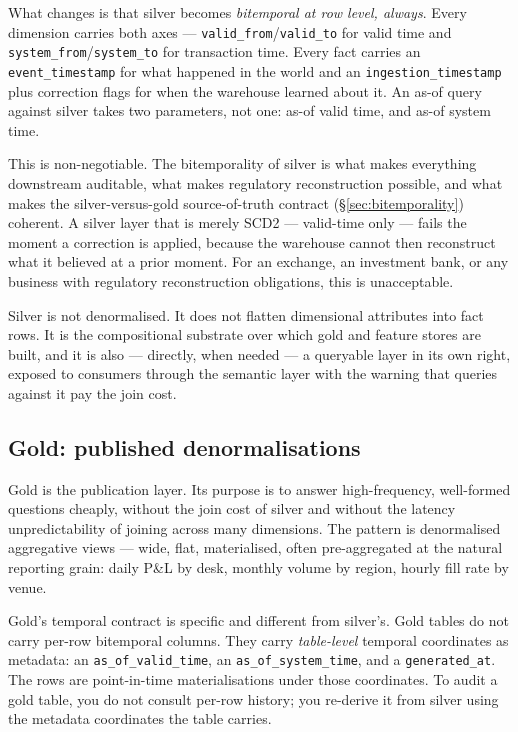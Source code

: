 \documentclass[11pt,a4paper]{article}
\begin{document}
What changes is that silver becomes \emph{bitemporal at row level, always}. Every dimension carries both axes --- \texttt{valid\_from}/\texttt{valid\_to} for valid time and \texttt{system\_from}/\texttt{system\_to} for transaction time. Every fact carries an \texttt{event\_timestamp} for what happened in the world and an \texttt{ingestion\_timestamp} plus correction flags for when the warehouse learned about it. An as-of query against silver takes two parameters, not one: as-of valid time, and as-of system time.

This is non-negotiable. The bitemporality of silver is what makes everything downstream auditable, what makes regulatory reconstruction possible, and what makes the silver-versus-gold source-of-truth contract (\S\ref{sec:bitemporality}) coherent. A silver layer that is merely SCD2 --- valid-time only --- fails the moment a correction is applied, because the warehouse cannot then reconstruct what it believed at a prior moment. For an exchange, an investment bank, or any business with regulatory reconstruction obligations, this is unacceptable.

Silver is not denormalised. It does not flatten dimensional attributes into fact rows. It is the compositional substrate over which gold and feature stores are built, and it is also --- directly, when needed --- a queryable layer in its own right, exposed to consumers through the semantic layer with the warning that queries against it pay the join cost.

\subsection{Gold: published denormalisations}

Gold is the publication layer. Its purpose is to answer high-frequency, well-formed questions cheaply, without the join cost of silver and without the latency unpredictability of joining across many dimensions. The pattern is denormalised aggregative views --- wide, flat, materialised, often pre-aggregated at the natural reporting grain: daily P\&L by desk, monthly volume by region, hourly fill rate by venue.

Gold's temporal contract is specific and different from silver's. Gold tables do not carry per-row bitemporal columns. They carry \emph{table-level} temporal coordinates as metadata: an \texttt{as\_of\_valid\_time}, an \texttt{as\_of\_system\_time}, and a \texttt{generated\_at}. The rows are point-in-time materialisations under those coordinates. To audit a gold table, you do not consult per-row history; you re-derive it from silver using the metadata coordinates the table carries.
\end{document}
